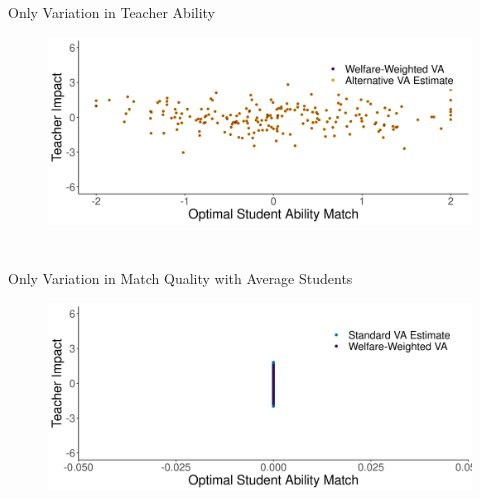 \documentclass[11pt]{beamer}
\begin{document}
\section*{}
\begin{frame}[noframenumbering]{Only Variation in Teacher Ability}

\hypertarget{np_cent1}{}
\vfill

\begin{figure}
    \centering
 \includegraphics[width=.75\textwidth]{slides/Figures/np_welfare_cent_run_1.png}
\end{figure}

\hyperlink{teacher_ability2}{}

\end{frame}



\section*{}
\begin{frame}[noframenumbering]{Only Variation in Match Quality with Average Students}

\hypertarget{st_cent2}{}
\vfill

\begin{figure}
    \centering
 \includegraphics[width=.75\textwidth]{slides/Figures/standard_est_cent_run_2.png}
\end{figure}

\hyperlink{match_average1}{}

\end{frame}
\end{document}
